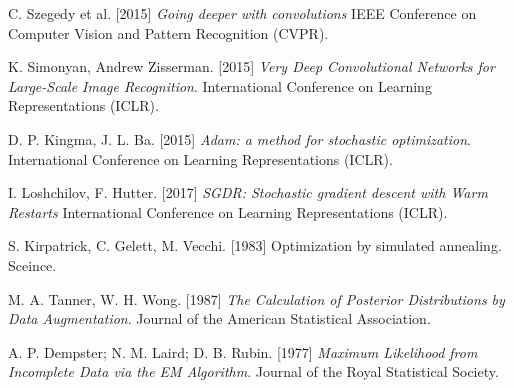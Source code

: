 \begin{thebibliography}{99}
	 C. Szegedy et al. [2015]
	 \textit{Going deeper with convolutions}
	 IEEE Conference on Computer Vision and Pattern Recognition (CVPR).
	 
	 K. Simonyan, Andrew Zisserman. [2015]
	 \textit{Very Deep Convolutional Networks for Large-Scale Image Recognition}.
	 International Conference on Learning Representations (ICLR).
	 
	 D. P. Kingma, J. L. Ba. [2015]
	 \textit{Adam: a method for stochastic optimization}.
	 International Conference on Learning Representations (ICLR).
	 
	 I. Loshchilov, F. Hutter. [2017]
	 \textit{SGDR: Stochastic gradient descent with Warm Restarts}
	 International Conference on Learning Representations (ICLR).
	 	 
	 S. Kirpatrick, C. Gelett, M. Vecchi. [1983]
	 Optimization by simulated annealing.
	 Sceince.
	 
	M. A. Tanner, W. H. Wong. [1987]
	\textit{The Calculation of Posterior Distributions by Data Augmentation}.
	Journal of the American Statistical Association.
	
	A. P. Dempster; N. M. Laird; D. B. Rubin. [1977]
	\textit{Maximum Likelihood from Incomplete Data via the EM Algorithm}.
	Journal of the Royal Statistical Society.
	
\end{thebibliography}

